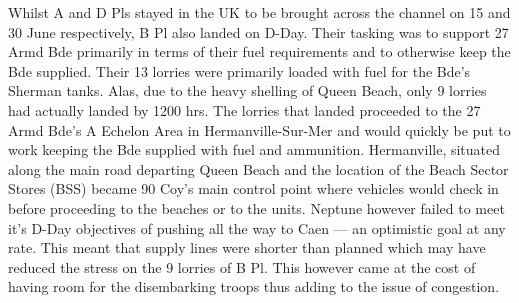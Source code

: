 \documentclass[noraggedright]{turabian-researchpaper}
\begin{document}
Whilst A and D Pls stayed in the UK to be brought across the channel on 15 
and 30 June respectively, B Pl also landed on D-Day.  Their tasking was to 
support 27 Armd Bde primarily in terms of their fuel requirements and 
to otherwise keep the Bde supplied.  Their 13 %
lorries were primarily loaded with fuel for the Bde's Sherman tanks.  Alas,
due to the heavy shelling of Queen Beach, only 9 lorries had actually 
landed by 1200 hrs.  The lorries that landed proceeded to the 27 Armd Bde's 
A Echelon Area in Hermanville-Sur-Mer and would quickly be put to work keeping
the Bde supplied with fuel and ammunition.\autocite[6 June 1944]{90wd}
Hermanville, situated along the main road departing Queen Beach and the 
location of the Beach Sector Stores (BSS) became 90 Coy's main control point 
where vehicles would check in before proceeding to the beaches or to the 
units. %
%
Neptune however failed to meet it's D-Day objectives of pushing all the way
to Caen --- an optimistic goal at any rate. %
This meant that supply lines were shorter than planned which may have reduced 
the stress on the 9 lorries of B Pl.  This however came at the cost of having
room for the disembarking troops thus adding to the issue of congestion.  
\end{document}
